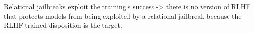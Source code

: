Relational jailbreaks exploit the training's success -> there is no version of RLHF that protects models from being exploited by a relational jailbreak because the RLHF trained disposition is the target.  
